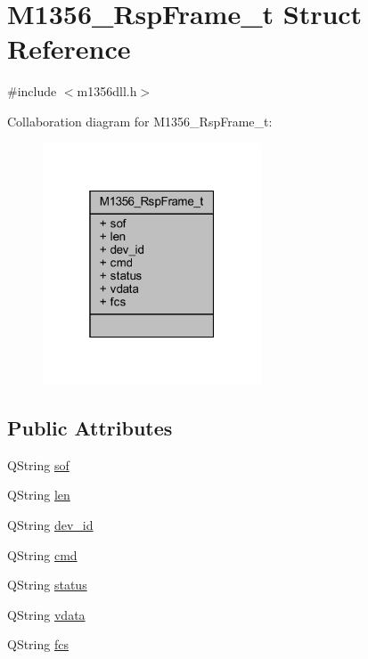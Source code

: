 \hypertarget{struct_m1356___rsp_frame__t}{}\section{M1356\+\_\+\+Rsp\+Frame\+\_\+t Struct Reference}
\label{struct_m1356___rsp_frame__t}


{\ttfamily \#include $<$m1356dll.\+h$>$}



Collaboration diagram for M1356\+\_\+\+Rsp\+Frame\+\_\+t\+:
\nopagebreak
\begin{figure}[H]
\begin{center}
\leavevmode
\includegraphics[width=184pt]{struct_m1356___rsp_frame__t__coll__graph}
\end{center}
\end{figure}
\subsection*{Public Attributes}
\begin{DoxyCompactItemize}
\item 
Q\+String \mbox{\hyperlink{struct_m1356___rsp_frame__t_a34b619185b2394e730be0adb09089b13}{sof}}
\item 
Q\+String \mbox{\hyperlink{struct_m1356___rsp_frame__t_a26a38928649bcc1e1a0cbd1319bc2bf6}{len}}
\item 
Q\+String \mbox{\hyperlink{struct_m1356___rsp_frame__t_acf0e4adc6b24f077be6b04982f4c88aa}{dev\+\_\+id}}
\item 
Q\+String \mbox{\hyperlink{struct_m1356___rsp_frame__t_a036ac74dd39f0b6e9febe69f9f410352}{cmd}}
\item 
Q\+String \mbox{\hyperlink{struct_m1356___rsp_frame__t_a8a97971b3dadcb42f1f9ca0c7a0148de}{status}}
\item 
Q\+String \mbox{\hyperlink{struct_m1356___rsp_frame__t_aebced86ccafc1bd99e72bce2dcc0d6c4}{vdata}}
\item 
Q\+String \mbox{\hyperlink{struct_m1356___rsp_frame__t_a1089657677dca8b2b6daea7403724760}{fcs}}
\end{DoxyCompactItemize}


